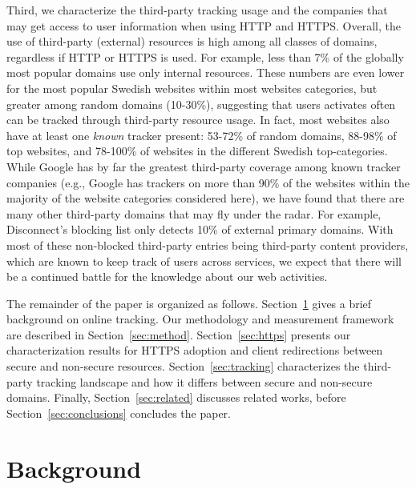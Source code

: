 \documentclass{sig-alternate-10pt}
\begin{document}
Third, we characterize the third-party tracking usage and the companies that may get access 
to user information when using HTTP and HTTPS.  Overall, the use of third-party (external) 
resources is high among all classes of domains, regardless if HTTP or HTTPS is used.  
For example, less than 7\% of the globally most popular domains use only internal resources.  
These numbers are even lower for the most popular Swedish websites within most websites categories, 
but greater among random domains (10-30\%), suggesting that users activates often can be tracked 
through third-party resource usage.  In fact, most websites also have at least one {\em known} 
tracker present: 53-72\% of random domains, 88-98\% of top websites, and 78-100\% of websites 
in the different Swedish top-categories.  While Google has by far the greatest third-party 
coverage among known tracker companies (e.g., Google has trackers on more than 90\% of the 
websites within the majority of the website categories considered here), we have found that 
there are many other third-party domains that may fly under the radar.  For example, 
Disconnect's blocking list only detects 10\% of external primary domains.  With most 
of these non-blocked third-party entries being third-party content providers, which are 
known to keep track of users across services, we expect that there will be a continued 
battle for the knowledge about our web activities.

The remainder of the paper is organized as follows. Section~\ref{sec:background} gives 
a brief background on online tracking.  Our methodology and measurement framework are 
described in Section~\ref{sec:method}.  Section~\ref{sec:https} presents our 
characterization results for HTTPS adoption and client redirections between 
secure and non-secure resources.  Section~\ref{sec:tracking} characterizes the 
third-party tracking landscape and how it differs between secure and non-secure 
domains. Finally, Section~\ref{sec:related} discusses related works, before 
Section~\ref{sec:conclusions} concludes the paper.

\section{Background}\label{sec:background}



\end{document}
